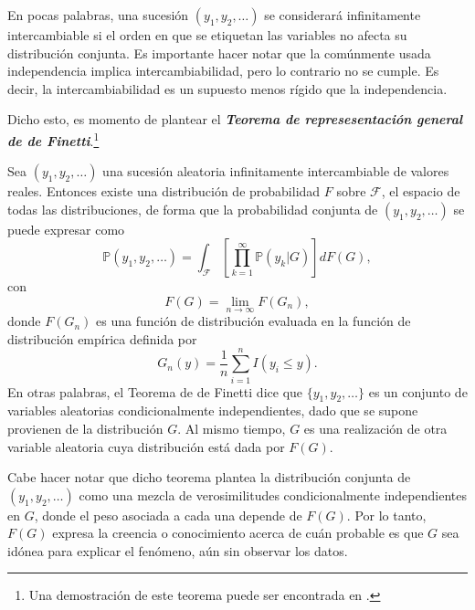 En pocas palabras, una sucesi\'on $(y_1,y_2,\ldots)$ se considerar\'a infinitamente intercambiable si el orden en que se etiquetan las variables no afecta su distribuci\'on conjunta. Es importante hacer notar que la com\'unmente usada independencia implica intercambiabilidad, pero lo contrario no se cumple. Es decir, la intercambiabilidad es un supuesto menos r\'igido que la independencia.

Dicho esto, es momento de plantear el \textbf{\textit{Teorema de represesentaci\'on general de de Finetti}}.\footnote{Una demostraci\'on de este teorema puede ser encontrada en \cite{Schervish_TheoryStats}.}

\begin{theorem*}
    Sea $(y_1,y_2,\ldots)$ una sucesi\'on aleatoria infinitamente intercambiable de valores reales. Entonces existe una distribuci\'on de probabilidad $F$ sobre $\mathcal{F}$, el espacio de todas las distribuciones, de forma que la probabilidad conjunta de $(y_1,y_2,\ldots)$ se puede expresar como
    \begin{equation*}
        \mathbb{P}(y_1,y_2,\ldots) =
        \int_{\mathcal{F}}\left[\prod_{k=1}^\infty \mathbb{P}(y_k|G)\right]dF(G),
    \end{equation*}
    con
    \begin{equation*}
        F(G) = \lim_{n \to \infty} F(G_n),
    \end{equation*}
    donde $F(G_n)$ es una funci\'on de distribuci\'on evaluada en la funci\'on de distribuci\'on emp\'irica definida por
    \begin{equation*}
        G_n(y) = \frac{1}{n} \sum_{i=1}^n I(y_i \leq y).
    \end{equation*}
    En otras palabras, el Teorema de de Finetti dice que $\{y_1,y_2,\ldots\}$ es un conjunto de variables aleatorias condicionalmente independientes, dado que se supone provienen de la distribuci\'on $G$. Al mismo tiempo, $G$ es una realizaci\'on de otra variable aleatoria cuya distribuci\'on est\'a dada por $F(G)$.
\end{theorem*}

Cabe hacer notar que dicho teorema plantea la distribuci\'on conjunta de $(y_1,y_2,\ldots)$ como una mezcla de verosimilitudes condicionalmente independientes en $G$, donde el peso asociada a cada una depende de $F(G)$. Por lo tanto, $F(G)$ expresa la creencia o conocimiento acerca de cu\'an probable es que $G$ sea id\'onea para explicar el fen\'omeno, a\'un sin observar los datos.

